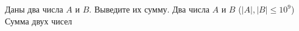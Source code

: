 Даны два числа $A$ и $B$. Выведите их сумму.
\InputFile
Два числа $A$ и $B$ ($|A|,|B|\leq 10^9$)
\OutputFile
Сумма двух чисел

